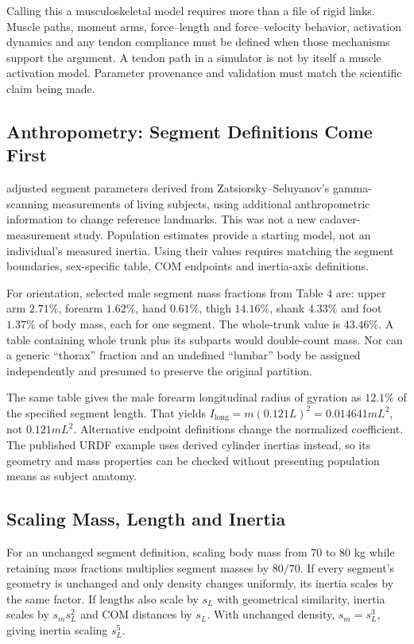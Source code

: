 Calling this a musculoskeletal model requires more than a file of rigid links. Muscle paths, moment arms, force--length and force--velocity behavior, activation dynamics and any tendon compliance must be defined when those mechanisms support the argument. A tendon path in a simulator is not by itself a muscle activation model. Parameter provenance and validation must match the scientific claim being made.

\subsection{Anthropometry: Segment Definitions Come First}
\label{ex:anthropometry}

\citet{DeLeva1996} adjusted segment parameters derived from Zatsiorsky--Seluyanov's gamma-scanning measurements of living subjects, using additional anthropometric information to change reference landmarks. This was not a new cadaver-measurement study. Population estimates provide a starting model, not an individual's measured inertia. Using their values requires matching the segment boundaries, sex-specific table, COM endpoints and inertia-axis definitions.

For orientation, selected male segment mass fractions from Table 4 are: upper arm $2.71\%$, forearm $1.62\%$, hand $0.61\%$, thigh $14.16\%$, shank $4.33\%$ and foot $1.37\%$ of body mass, each for one segment. The whole-trunk value is $43.46\%$. A table containing whole trunk plus its subparts would double-count mass. Nor can a generic ``thorax'' fraction and an undefined ``lumbar'' body be assigned independently and presumed to preserve the original partition.

The same table gives the male forearm longitudinal radius of gyration as $12.1\%$ of the specified segment length. That yields $I_{\mathrm{long}}=m(0.121L)^2=0.014641mL^2$, not $0.121mL^2$. Alternative endpoint definitions change the normalized coefficient. The published URDF example uses derived cylinder inertias instead, so its geometry and mass properties can be checked without presenting population means as subject anatomy.

\subsection{Scaling Mass, Length and Inertia}

For an unchanged segment definition, scaling body mass from 70 to 80 kg while retaining mass fractions multiplies segment masses by $80/70$. If every segment's geometry is unchanged and only density changes uniformly, its inertia scales by the same factor. If lengths also scale by $s_L$ with geometrical similarity, inertia scales by $s_m s_L^2$ and COM distances by $s_L$. With unchanged density, $s_m=s_L^3$, giving inertia scaling $s_L^5$.

